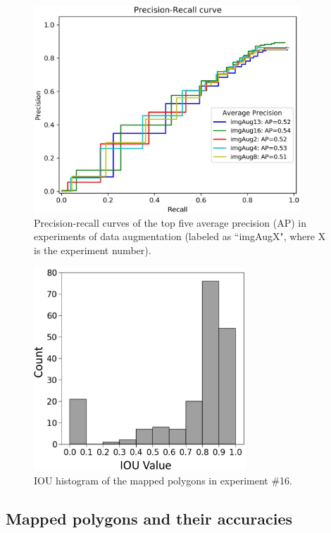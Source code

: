 \documentclass[authoryear,preprint,review,12pt]{elsarticle}
\begin{document}
\begin{figure}
	\centering
	\includegraphics[width=10cm]{figures/top5_curves_trim.jpg}
	\caption{Precision-recall curves of the top five average precision (AP) in experiments of data augmentation (labeled as ``imgAugX", where X is the experiment number).}
	\label{fig_ap_top5}
\end{figure}

\begin{figure}
	\centering
	\includegraphics[width=8cm]{figures/IoU_imgAug16_label_trim.jpg}
	\caption{IOU histogram of the mapped polygons in experiment \#16.}
	\label{fig_iou_hist_exp16}
\end{figure}

\subsection{Mapped polygons and their accuracies}
\label{subsec_mapped_accuracies}
\end{document}
